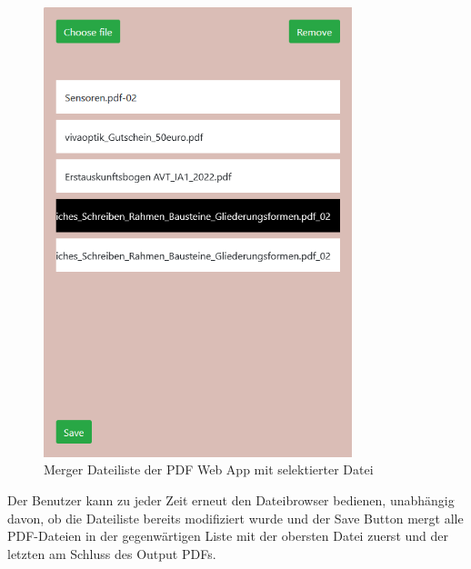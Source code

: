 \begin{figure}[!htbp]
	\centering
	\includegraphics[width=0.8\textwidth]{"images/mergelist.png"}
	\caption{Merger Dateiliste der PDF Web App mit selektierter Datei}
	\label{fig:mergelist}
\end{figure}

Der Benutzer kann zu jeder Zeit erneut den Dateibrowser bedienen, unabhängig davon, ob die Dateiliste bereits modifiziert wurde und der Save Button mergt alle PDF-Dateien in der gegenwärtigen Liste mit der obersten Datei zuerst und der letzten am Schluss des Output PDFs.




